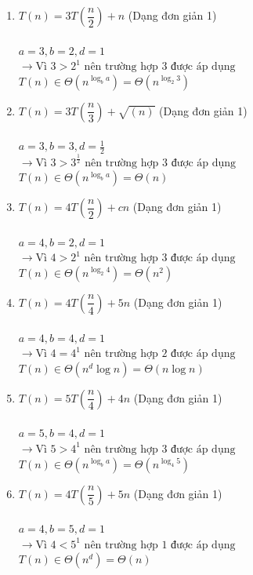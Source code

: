 \documentclass[12pt, letterpaper]{article}
\begin{document}
\begin{enumerate}[label=\bfseries\large\theenumi.]
    \item $ T(n) = 3T\left( \dfrac{n}{2} \right) + n $ (Dạng đơn giản 1) \\ \\
        $ a = 3, b = 2, d = 1 $ \\
        $ \rightarrow \text{Vì } 3 > 2^1 \text{ nên trường hợp 3 được áp dụng} $ \\
        $ T(n) \in \Theta(n^{\log_b a}) = \Theta(n^{\log_2 3}) $

    \item $ T(n) = 3T\left( \dfrac{n}{3} \right) + \sqrt{(n)} $ (Dạng đơn giản 1) \\ \\
        $ a = 3, b = 3, d = \frac{1}{2} $ \\
        $ \rightarrow \text{Vì } 3 > 3^{\frac{1}{2}} \text{ nên trường hợp 3 được áp dụng} $ \\
        $ T(n) \in \Theta(n^{\log_b a}) = \Theta(n) $

    \item $ T(n) = 4T\left( \dfrac{n}{2} \right) + cn $ (Dạng đơn giản 1) \\ \\
        $ a = 4, b = 2, d = 1 $ \\
        $ \rightarrow \text{Vì } 4 > 2^1 \text{ nên trường hợp 3 được áp dụng} $ \\
        $ T(n) \in \Theta(n^{\log_2 4}) = \Theta(n^2) $

    \item $ T(n) = 4T\left( \dfrac{n}{4} \right) + 5n $ (Dạng đơn giản 1) \\ \\
        $ a = 4, b = 4, d = 1 $ \\
        $ \rightarrow \text{Vì } 4 = 4^1 \text{ nên trường hợp 2 được áp dụng} $ \\
        $ T(n) \in \Theta(n^d \log n) = \Theta(n \log n) $

    \item $ T(n) = 5T\left( \dfrac{n}{4} \right) + 4n $ (Dạng đơn giản 1) \\ \\
        $ a = 5, b = 4, d = 1 $ \\
        $ \rightarrow \text{Vì } 5 > 4^1 \text{ nên trường hợp 3 được áp dụng} $ \\
        $ T(n) \in \Theta(n^{\log_b a}) = \Theta(n^{\log_4 5}) $

    \item $ T(n) = 4T\left( \dfrac{n}{5} \right) + 5n $ (Dạng đơn giản 1) \\ \\
        $ a = 4, b = 5, d = 1 $ \\
        $ \rightarrow \text{Vì } 4 < 5^1 \text{ nên trường hợp 1 được áp dụng} $ \\
        $ T(n) \in \Theta(n^d) = \Theta(n) $


\end{enumerate}
\end{document}
